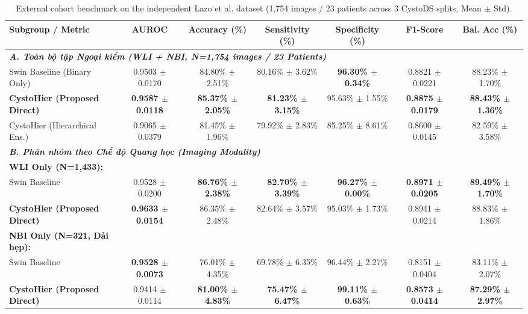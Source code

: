 \begin{table}[t]
\centering
\caption{External cohort benchmark on the independent Lazo et al. dataset (1,754 images / 23 patients across 3 CystoDS splits, Mean $\pm$ Std).}
\label{tab:external_validation}
\begin{adjustbox}{max width=\textwidth}
\begin{tabular}{lcccccc}
\toprule
\textbf{Subgroup / Metric} & \textbf{AUROC} & \textbf{Accuracy (\%)} & \textbf{Sensitivity (\%)} & \textbf{Specificity (\%)} & \textbf{F1-Score} & \textbf{Bal. Acc (\%)} \\
\midrule
\multicolumn{7}{l}{\textit{\textbf{A. Toàn bộ tập Ngoại kiểm (WLI + NBI, N=1,754 images / 23 Patients)}}} \\
Swin Baseline (Binary Only) & 0.9503 $\pm$ 0.0170 & 84.80\% $\pm$ 2.51\% & 80.16\% $\pm$ 3.62\% & \textbf{96.30\% $\pm$ 0.34\%} & 0.8821 $\pm$ 0.0221 & 88.23\% $\pm$ 1.70\% \\
\textbf{CystoHier (Proposed Direct)} & \textbf{0.9587 $\pm$ 0.0118} & \textbf{85.37\% $\pm$ 2.05\%} & \textbf{81.23\% $\pm$ 3.15\%} & 95.63\% $\pm$ 1.55\% & \textbf{0.8875 $\pm$ 0.0179} & \textbf{88.43\% $\pm$ 1.36\%} \\
CystoHier (Hierarchical Ens.) & 0.9065 $\pm$ 0.0379 & 81.45\% $\pm$ 1.96\% & 79.92\% $\pm$ 2.83\% & 85.25\% $\pm$ 8.61\% & 0.8600 $\pm$ 0.0145 & 82.59\% $\pm$ 3.58\% \\
\midrule
\multicolumn{7}{l}{\textit{\textbf{B. Phân nhóm theo Chế độ Quang học (Imaging Modality)}}} \\
\textbf{WLI Only (N=1,433):} & & & & & & \\
\quad Swin Baseline & 0.9528 $\pm$ 0.0200 & \textbf{86.76\% $\pm$ 2.38\%} & \textbf{82.70\% $\pm$ 3.39\%} & \textbf{96.27\% $\pm$ 0.00\%} & \textbf{0.8971 $\pm$ 0.0205} & \textbf{89.49\% $\pm$ 1.70\%} \\
\quad \textbf{CystoHier (Proposed Direct)} & \textbf{0.9633 $\pm$ 0.0154} & 86.35\% $\pm$ 2.48\% & 82.64\% $\pm$ 3.57\% & 95.03\% $\pm$ 1.73\% & 0.8941 $\pm$ 0.0214 & 88.83\% $\pm$ 1.86\% \\
\textbf{NBI Only (N=321, Dải hẹp):} & & & & & & \\
\quad Swin Baseline & \textbf{0.9528 $\pm$ 0.0073} & 76.01\% $\pm$ 4.35\% & 69.78\% $\pm$ 6.35\% & 96.44\% $\pm$ 2.27\% & 0.8151 $\pm$ 0.0404 & 83.11\% $\pm$ 2.07\% \\
\quad \textbf{CystoHier (Proposed Direct)} & 0.9414 $\pm$ 0.0114 & \textbf{81.00\% $\pm$ 4.83\%} & \textbf{75.47\% $\pm$ 6.47\%} & \textbf{99.11\% $\pm$ 0.63\%} & \textbf{0.8573 $\pm$ 0.0414} & \textbf{87.29\% $\pm$ 2.97\%} \\

\end{tabular}
\end{adjustbox}
\end{table}
